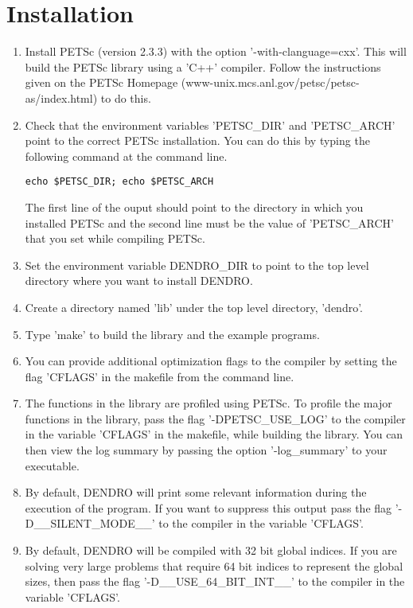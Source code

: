 \documentclass[10pt,reqno,a4paper]{report}
\numberwithin{equation}{section}
\begin{document}
\chapter{Installation}
\label{chp:install}
\begin{enumerate}
\item Install PETSc (version 2.3.3) with the option '-with-clanguage=cxx'.  This will build the PETSc library using a 'C++' compiler. Follow the instructions given on the PETSc Homepage (www-unix.mcs.anl.gov/petsc/petsc-as/index.html) to do this. 
\item Check that the environment variables 'PETSC\_DIR' and 'PETSC\_ARCH' point to the correct PETSc installation. You can do this by typing the following command at the command line.
\begin{verbatim}
echo $PETSC_DIR; echo $PETSC_ARCH
\end{verbatim} 
The first line of the ouput should point to the directory in which you installed PETSc and the second line must be the value of 'PETSC\_ARCH' that you set while compiling PETSc.
\item Set the environment variable DENDRO\_DIR to point to the top level directory where you want to install DENDRO. 
\item Create a directory named 'lib' under the top level directory, 'dendro'.
\item Type 'make' to build the library and the example programs. 
\item You can provide additional optimization flags to the compiler by setting the flag 'CFLAGS' in the makefile from the command line.
\item The functions in the library are profiled using PETSc. 
To profile the major functions in the library, pass the flag '-DPETSC\_USE\_LOG' to the compiler in the
variable 'CFLAGS' in the makefile, while building the library.
You can then view the log summary by passing the
 option '-log\_summary' to your executable.
 \item By default, DENDRO will print some relevant information during the execution of the program. If you want to suppress this output pass the flag '-D\_\_SILENT\_MODE\_\_' to the compiler in the variable 'CFLAGS'.
 \item By default, DENDRO will be compiled with 32 bit global indices. If you are solving very large problems that require 64 bit indices to represent the global sizes, then pass the flag '-D\_\_USE\_64\_BIT\_INT\_\_' to the compiler in the variable 'CFLAGS'.
\end{enumerate}
\end{document}
